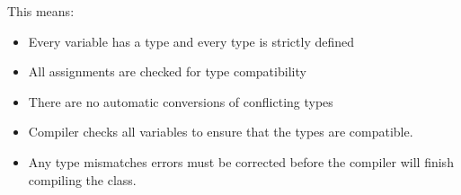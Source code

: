 


\begin{flushleft}
	
	This means:
	\begin{itemize}
		\item Every variable has a type and every type is strictly defined
		\item All assignments are checked for type compatibility
		\item There are no automatic conversions of conflicting types
		\item Compiler checks all variables to ensure that the types are compatible. 
		\item Any type mismatches errors must be corrected before the compiler will finish compiling the class.
		
	\end{itemize}
	
	
\end{flushleft}
	




